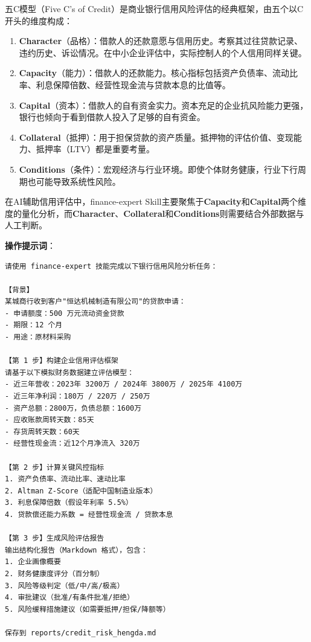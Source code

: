 \begin{theorybox}[信用风险评估的五C模型]
五C模型（Five C's of Credit）是商业银行信用风险评估的经典框架，由五个以C开头的维度构成：

\begin{enumerate}[leftmargin=1em]
  \item \textbf{Character}（品格）：借款人的还款意愿与信用历史。考察其过往贷款记录、违约历史、诉讼情况。在中小企业评估中，实际控制人的个人信用同样关键。
  \item \textbf{Capacity}（能力）：借款人的还款能力。核心指标包括资产负债率、流动比率、利息保障倍数、经营性现金流与贷款本息的比值等。
  \item \textbf{Capital}（资本）：借款人的自有资金实力。资本充足的企业抗风险能力更强，银行也倾向于看到借款人投入了足够的自有资金。
  \item \textbf{Collateral}（抵押）：用于担保贷款的资产质量。抵押物的评估价值、变现能力、抵押率（LTV）都是重要考量。
  \item \textbf{Conditions}（条件）：宏观经济与行业环境。即使个体财务健康，行业下行周期也可能导致系统性风险。
\end{enumerate}

在AI辅助信用评估中，finance-expert Skill主要聚焦于\textbf{Capacity}和\textbf{Capital}两个维度的量化分析，而\textbf{Character}、\textbf{Collateral}和\textbf{Conditions}则需要结合外部数据与人工判断。
\end{theorybox}

\textbf{操作提示词}：

\begin{lstlisting}
请使用 finance-expert 技能完成以下银行信用风险分析任务：

【背景】
某城商行收到客户"恒达机械制造有限公司"的贷款申请：
- 申请额度：500 万元流动资金贷款
- 期限：12 个月
- 用途：原材料采购

【第 1 步】构建企业信用评估框架
请基于以下模拟财务数据建立评估模型：
- 近三年营收：2023年 3200万 / 2024年 3800万 / 2025年 4100万
- 近三年净利润：180万 / 220万 / 250万
- 资产总额：2800万，负债总额：1600万
- 应收账款周转天数：85天
- 存货周转天数：60天
- 经营性现金流：近12个月净流入 320万

【第 2 步】计算关键风控指标
1. 资产负债率、流动比率、速动比率
2. Altman Z-Score（适配中国制造业版本）
3. 利息保障倍数（假设年利率 5.5%）
4. 贷款偿还能力系数 = 经营性现金流 / 贷款本息

【第 3 步】生成风险评估报告
输出结构化报告（Markdown 格式），包含：
1. 企业画像概要
2. 财务健康度评分（百分制）
3. 风险等级判定（低/中/高/极高）
4. 审批建议（批准/有条件批准/拒绝）
5. 风险缓释措施建议（如需要抵押/担保/降额等）

保存到 reports/credit_risk_hengda.md
\end{lstlisting}

